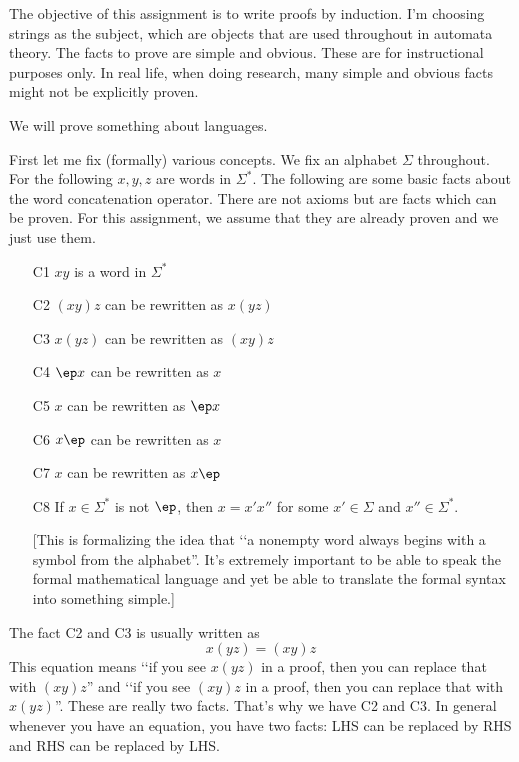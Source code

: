 

\renewcommand\AUTHOR{John Doe}


\topmatter


The objective of this assignment is to write proofs by induction.
I'm choosing strings as the subject, which are objects that are
used throughout in automata theory.
The facts to prove are simple and obvious.
These are for instructional purposes only.
In real life, when doing research, many simple and obvious facts
might not be explicitly proven.

\newpage
We will prove something about languages.

First let me fix (formally) various concepts.
We fix an alphabet $\Sigma$ throughout.
For the following $x,y,z$ are words in $\Sigma^*$.
The following are some basic facts about the word concatenation operator.
There are not axioms but are facts which can be proven.
For this assignment, we assume that they are already proven and we
just use them.
\begin{enumerate}
\item[C1] $xy$ is a word in $\Sigma^*$
\item[C2] $(xy)z$ can be rewritten as $x(yz)$
\item[C3] $x(yz)$ can be rewritten as $(xy)z$
\item[C4] $\ep x$ can be rewritten as $x$
\item[C5] $x$ can be rewritten as $\ep x$
\item[C6] $x\ep$ can be rewritten as $x$
\item[C7] $x$ can be rewritten as $x\ep$
\item[C8] If $x \in \Sigma^*$ is not $\ep$, then 
$x = x'x''$ for some $x' \in \Sigma$ and $x'' \in \Sigma^*$.

[This is formalizing the idea that 
\lq\lq a nonempty word always begins with a symbol from the alphabet''.
It's extremely important to be able to speak the formal
mathematical language and yet be able to translate the formal 
syntax into something simple.]
\end{enumerate}

The fact C2 and C3 is usually written as
\[
x(yz) = (xy)z
\]
This equation means
\lq\lq if you see $x(yz)$ in a proof, then
you can replace that with $(xy)z$''
and
\lq\lq if you see $(xy)z$ in a proof, then
you can replace that with $x(yz)$''.
These are really two facts.
That's why we have C2 and C3.
In general whenever you have an equation, you have
two facts: LHS can be replaced by RHS and RHS can be
replaced by LHS.

